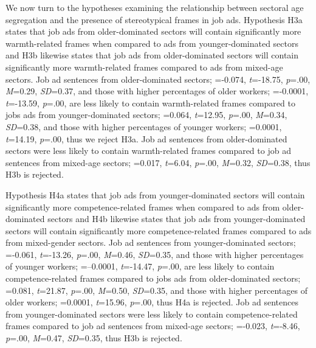 \documentclass[man]{apa7}
\begin{document}
We now turn to the hypotheses examining the relationship between sectoral age segregation and the presence of stereotypical frames in job ads. Hypothesis H3a states that job ads from older-dominated sectors will contain significantly more warmth-related frames when compared to ads from younger-dominated sectors and H3b likewise states that job ads from older-dominated sectors will contain significantly more warmth-related frames compared to ads from mixed-age sectors. Job ad sentences from older-dominated sectors; \textit{\textbeta}=-0.074, \textit{t}=-18.75, \textit{p}=.00, \textit{M}=0.29, \textit{SD}=0.37, and those with higher percentages of older workers; \textit{\textbeta}=-0.0001, \textit{t}=-13.59, \textit{p}=.00, are less likely to contain warmth-related frames compared to jobs ads from younger-dominated sectors; \textit{\textbeta}=0.064, \textit{t}=12.95, \textit{p}=.00, \textit{M}=0.34, \textit{SD}=0.38, and those with higher percentages of younger workers; \textit{\textbeta}=0.0001, \textit{t}=14.19, \textit{p}=.00, thus we reject H3a. Job ad sentences from older-dominated sectors were less likely to contain warmth-related frames compared to job ad sentences from mixed-age sectors; \textit{\textbeta}=0.017, \textit{t}=6.04, \textit{p}=.00, \textit{M}=0.32, \textit{SD}=0.38, thus H3b is rejected.

Hypothesis H4a states that job ads from younger-dominated sectors will contain significantly more competence-related frames when compared to ads from older-dominated sectors and H4b likewise states that job ads from younger-dominated sectors will contain significantly more competence-related frames compared to ads from mixed-gender sectors. Job ad sentences from younger-dominated sectors; \textit{\textbeta}=-0.061, \textit{t}=-13.26, \textit{p}=.00, \textit{M}=0.46, \textit{SD}=0.35, and those with higher percentages of younger workers; \textit{\textbeta}=--0.0001, \textit{t}=-14.47, \textit{p}=.00, are less likely to contain competence-related frames compared to jobs ads from older-dominated sectors; \textit{\textbeta}=0.081, \textit{t}=21.87, \textit{p}=.00, \textit{M}=0.50, \textit{SD}=0.35, and those with higher percentages of older workers; \textit{\textbeta}=0.0001, \textit{t}=15.96, \textit{p}=.00, thus H4a is rejected. Job ad sentences from younger-dominated sectors were less likely to contain competence-related frames compared to job ad sentences from mixed-age sectors; \textit{\textbeta}=-0.023, \textit{t}=-8.46, \textit{p}=.00, \textit{M}=0.47, \textit{SD}=0.35, thus H3b is rejected.
\end{document}

